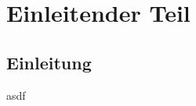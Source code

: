 \part{Einleitender Teil}
\label{part:EinleitenderTeil}

\chapter{Einleitung}
\label{chap:Einleitung}
asdf